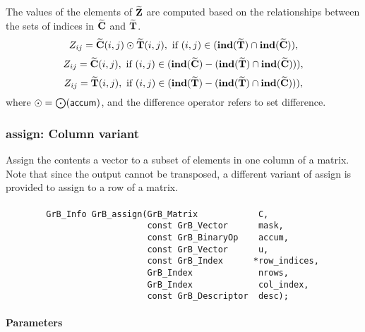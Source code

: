 \begin{itemize}
    The values of the elements of ${\bf \widetilde{Z}}$ are computed based on the
    relationships between the sets of indices in ${\bf \widetilde{C}}$ and 
    ${\bf \widetilde{T}}$.
\[
    Z_{ij} = {\bf \widetilde{C}}(i,j) \odot {\bf \widetilde{T}}(i,j), \ \mbox{if}\  
    (i,j) \in  (\bold{ind}({\bf \widetilde{T}}) \cap \bold{ind}({\bf \widetilde{C}})),
\]
\[
    Z_{ij} = \matrix{\widetilde{C}}(i,j), \ \mbox{if}\  
    (i,j) \in (\bold{ind}(\matrix{\widetilde{C}}) - (\bold{ind}(\matrix{\widetilde{T}})
    \cap \bold{ind}(\matrix{\widetilde{C}}))),
\]
\[
    Z_{ij} = \matrix{\widetilde{T}}(i,j), \ \mbox{if}\  (i,j) \in  
    (\bold{ind}(\matrix{\widetilde{T}}) - (\bold{ind}(\matrix{\widetilde{T}})
    \cap \bold{ind}(\matrix{\widetilde{C}}))),
\]
where $\odot  = \bigodot({\sf accum})$, and the difference operator refers to set difference.
\end{itemize}





\subsubsection{{\sf assign}: Column variant}

Assign the contents a vector to a subset of elements in one column of a matrix. 
Note that since the output cannot be transposed, a different variant of
{\sf assign} is provided to assign to a row of a matrix.

\paragraph{\syntax}

\begin{verbatim}
        GrB_Info GrB_assign(GrB_Matrix            C,
                            const GrB_Vector      mask,
                            const GrB_BinaryOp    accum,
                            const GrB_Vector      u,
                            const GrB_Index      *row_indices,
                            GrB_Index             nrows,
                            GrB_Index             col_index,
                            const GrB_Descriptor  desc);
\end{verbatim}

\paragraph{Parameters}

